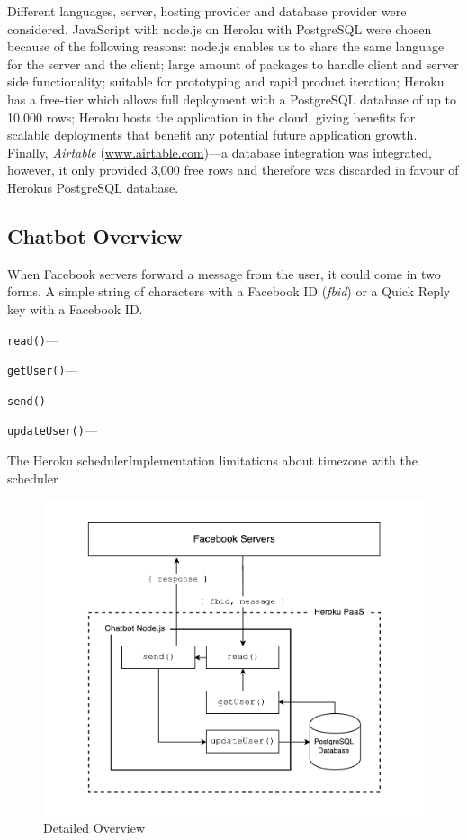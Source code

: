 Different languages, server, hosting provider and database provider were considered. JavaScript with node.js on Heroku with PostgreSQL were chosen because of the following reasons: node.js enables us to share the same language for the server and the client; large amount of packages to handle client and server side functionality; suitable for prototyping and rapid product iteration; Heroku has a free-tier which allows full deployment with a PostgreSQL database of up to 10,000 rows; Heroku hosts the application in the cloud, giving benefits for scalable deployments that benefit any potential future application growth. Finally, \textit{Airtable} (\url{www.airtable.com})---a database integration was integrated, however, it only provided 3,000 free rows and therefore was discarded in favour of Herokus PostgreSQL database.

\subsection*{Chatbot Overview}
When Facebook servers forward a message from the user, it could come in two forms. A simple string of characters with a Facebook ID (\textit{fbid}) or a Quick Reply key with a Facebook ID.

\verb|read()|---


\verb|getUser()|---


\verb|send()|---


\verb|updateUser()|---


The Heroku schedulerImplementation limitations about timezone with the scheduler\newline


\begin{figure}[H]
    \centering
    \includegraphics[width=6in]{../resources/diagrams/chatbot-detailed-overview.pdf}
    \caption{Detailed Overview}
    \label{fig:prototype_detailed_overview}
\end{figure}


